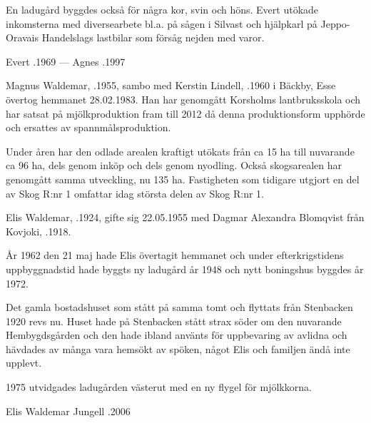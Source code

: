 En ladugård byggdes också för några kor, svin och höns. Evert utökade inkomsterna med diversearbete bl.a. på sågen i Silvast och hjälpkarl på
Jeppo-Oravais Handelslags lastbilar som försåg nejden med varor.

Evert .1969   ---    Agnes .1997






Magnus Waldemar, .1955, sambo med Kerstin Lindell, .1960 i Bäckby, Esse övertog hemmanet 28.02.1983. Han har genomgått Korsholms lantbruksskola och har satsat på mjölkproduktion fram till 2012 då denna produktionsform upphörde och ersattes av spannmålsproduktion.

Under åren har den odlade arealen kraftigt utökats från ca 15 ha till nuvarande ca 96 ha, dels genom inköp och dels genom nyodling. Också skogsarealen har genomgått samma utveckling, nu 135 ha. Fastigheten som tidigare utgjort en del av Skog R:nr 1 omfattar idag största delen av Skog R:nr 1.

Elis Waldemar, .1924, gifte sig 22.05.1955 med Dagmar Alexandra Blomqvist från Kovjoki, .1918.

År 1962 den 21 maj hade Elis övertagit hemmanet och under efterkrigstidens uppbyggnadstid hade byggts ny ladugård år 1948 och nytt boningshus byggdes år 1972.

Det gamla bostadshuset som stått på samma tomt och flyttats från Stenbacken 1920 revs nu. Huset hade på Stenbacken stått strax söder om den nuvarande Hembygdsgården och den hade ibland använts för uppbevaring av avlidna och hävdades av många vara hemsökt av spöken, något Elis och familjen ändå inte upplevt.

1975 utvidgades ladugården västerut med en ny flygel för mjölkkorna.

\begin{jhchildren}
  \item {}
  \item {}
\end{jhchildren}

Elis Waldemar Jungell .2006



